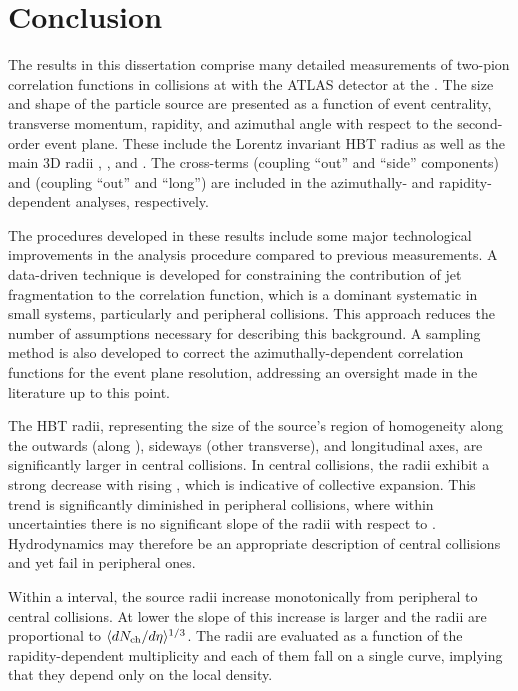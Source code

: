 \chapter{Conclusion}
\label{ch:conclusion}

The results in this dissertation comprise many detailed measurements of two-pion correlation functions in \pPb collisions at \pPbenergy with the ATLAS detector at the \lhc.
The size and shape of the particle source are presented as a function of event centrality, transverse momentum, rapidity, and azimuthal angle with respect to the second-order event plane.
These include the Lorentz invariant HBT radius \Rinv as well as the main 3D radii \Rout, \Rside, and \Rlong.
The cross-terms \Ros (coupling ``out'' and ``side'' components) and \Rol (coupling ``out'' and ``long'') are included in the azimuthally- and rapidity-dependent analyses, respectively.

The procedures developed in these results include some major technological improvements in the analysis procedure compared to previous measurements.
A data-driven technique is developed for constraining the contribution of jet fragmentation to the correlation function, which is a dominant systematic in small systems, particularly \pp and peripheral \pA collisions.
This approach reduces the number of assumptions necessary for describing this background.
A sampling method is also developed to correct the azimuthally-dependent correlation functions for the event plane resolution, addressing an oversight made in the literature up to this point.

The HBT radii, representing the size of the source's region of homogeneity along the outwards (along \kt), sideways (other transverse), and longitudinal axes, are significantly larger in central collisions.
In central collisions, the radii exhibit a strong decrease with rising \kt, which is indicative of collective expansion.
This trend is significantly diminished in peripheral collisions, where within uncertainties there is no significant slope of the radii with respect to \kt.
Hydrodynamics may therefore be an appropriate description of central \pPb collisions and yet fail in peripheral ones.

Within a \kt interval, the source radii increase monotonically from peripheral to central collisions.
At lower \kt the slope of this increase is larger and the radii are proportional to \(\langle d\mbox{$N_{\mathrm{ch}}$}/d\eta\rangle^{1/3}\).
The radii are evaluated as a function of the rapidity-dependent multiplicity \dNdy and each of them fall on a single curve, implying that they depend only on the local density.

